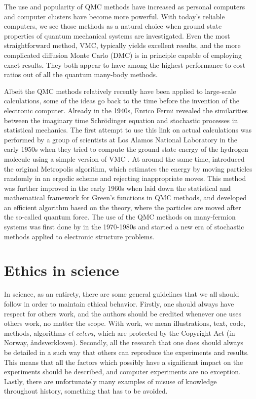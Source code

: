 The use and popularity of QMC methods have increased as personal computers and computer clusters have become more powerful. With today's reliable computers, we see those methods as a natural choice when ground state properties of quantum mechanical systems are investigated. Even the most straightforward method, VMC, typically yields excellent results, and the more complicated diffusion Monte Carlo (DMC) is in principle capable of employing exact results. They both appear to have among the highest performance-to-cost ratios out of all the quantum many-body methods. 

Albeit the QMC methods relatively recently have been applied to large-scale calculations, some of the ideas go back to the time before the invention of the electronic computer. Already in the 1940s, Enrico Fermi revealed the similarities between the imaginary time Schrödinger equation and stochastic processes in statistical mechanics\supercite{metropolis_monte_1949,ceperley_quantum_1986}. The first attempt to use this link on actual calculations was performed by a group of scientists at Los Alamos National Laboratory in the early 1950s when they tried to compute the ground state energy of the hydrogen molecule using a simple version of VMC \supercite{bajdich_electronic_2010}. At around the same time, \citet{metropolis_monte_1949} introduced the original Metropolis algorithm, which estimates the energy by moving particles randomly in an ergodic scheme and rejecting inappropriate moves. This method was further improved in the early 1960s when \citet{kalos} laid down the statistical and mathematical framework for Green's functions in QMC methods, and \citet{hastings_monte_1970} developed an efficient algorithm based on the theory, where the particles are moved after the so-called quantum force. The use of the QMC methods on many-fermion systems was first done by \citet{ceperley_quantum_1986} in the 1970-1980s and started a new era of stochastic methods applied to electronic structure problems. 

\section{Ethics in science}
In science, as an entirety, there are some general guidelines that we all should follow in order to maintain ethical behavior. Firstly, one should always have respect for others work, and the authors should be credited whenever one uses others work, no matter the scope. With work, we mean illustrations, text, code, methods, algorithms \textit{et cetera}, which are protected by the Copyright Act (in Norway, åndsverkloven). Secondly, all the research that one does should always be detailed in a such way that others can reproduce the experiments and results. This means that all the factors which possibly have a significant impact on the experiments should be described, and computer experiments are no exception. Lastly, there are unfortunately many examples of misuse of knowledge throughout history, something that has to be avoided.

